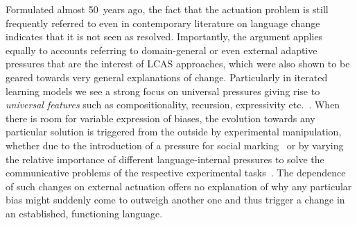 Formulated almost 50~years ago, the fact that the actuation problem is still frequently referred to even in contemporary literature on language change indicates that it is not seen as resolved. Importantly, the argument applies equally to accounts referring to domain-general or even external adaptive pressures that are the interest of LCAS approaches, which were also shown to be geared towards very general explanations of change. Particularly in iterated learning models we see a strong focus on universal pressures giving rise to \emph{universal features} such as compositionality, recursion, expressivity etc.~\citep{Brighton2002,Kirby2002,Cornish2009,Smith2013,Kirby2015}. %
When there is room for variable expression of biases, the evolution towards any particular solution is triggered from the outside by experimental manipulation, whether due to the introduction of a pressure for social marking~\citep{Roberts2013} or by varying the relative importance of different language-internal pressures to solve the communicative problems of the respective experimental tasks~\citep{Winters2015}. The dependence of such changes on external actuation offers no explanation of why any particular bias might suddenly come to outweigh another one and thus trigger a change in an established, functioning language.


